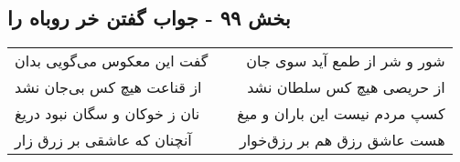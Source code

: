 \begin{center}
\section*{بخش ۹۹ - جواب گفتن خر روباه را}
\label{sec:sh099}
\begin{longtable}{l p{0.5cm} r}
گفت این معکوس می‌گویی بدان
&&
شور و شر از طمع آید سوی جان
\\
از قناعت هیچ کس بی‌جان نشد
&&
از حریصی هیچ کس سلطان نشد
\\
نان ز خوکان و سگان نبود دریغ
&&
کسپ مردم نیست این باران و میغ
\\
آنچنان که عاشقی بر زرق زار
&&
هست عاشق رزق هم بر رزق‌خوار
\\
\end{longtable}
\end{center}
